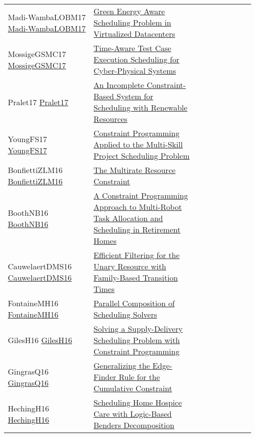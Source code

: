 {\begin{longtable}{p{3cm}p{7cm}lllllll}
Madi-WambaLOBM17 \href{https://doi.org/10.1109/ICPADS.2017.00089}{Madi-WambaLOBM17} &  \href{papers/Madi-WambaLOBM17.pdf}{Green Energy Aware Scheduling Problem in Virtualized Datacenters} &  &  &  &  &  &  & \\
MossigeGSMC17 \href{https://doi.org/10.1007/978-3-319-66158-2\_25}{MossigeGSMC17} &  \href{papers/MossigeGSMC17.pdf}{Time-Aware Test Case Execution Scheduling for Cyber-Physical Systems} &  &  &  &  &  &  & \\
Pralet17 \href{https://doi.org/10.1007/978-3-319-66158-2\_16}{Pralet17} &  \href{papers/Pralet17.pdf}{An Incomplete Constraint-Based System for Scheduling with Renewable Resources} &  &  &  &  &  &  & \\
YoungFS17 \href{https://doi.org/10.1007/978-3-319-66158-2\_20}{YoungFS17} &  \href{papers/YoungFS17.pdf}{Constraint Programming Applied to the Multi-Skill Project Scheduling Problem} &  &  &  &  &  &  & \\
BonfiettiZLM16 \href{https://doi.org/10.1007/978-3-319-44953-1\_8}{BonfiettiZLM16} &  \href{papers/BonfiettiZLM16.pdf}{The Multirate Resource Constraint} &  &  &  &  &  &  & \\
BoothNB16 \href{https://doi.org/10.1007/978-3-319-44953-1\_34}{BoothNB16} &  \href{papers/BoothNB16.pdf}{A Constraint Programming Approach to Multi-Robot Task Allocation and Scheduling in Retirement Homes} &  &  &  &  &  &  & \\
CauwelaertDMS16 \href{https://doi.org/10.1007/978-3-319-44953-1\_33}{CauwelaertDMS16} &  \href{papers/CauwelaertDMS16.pdf}{Efficient Filtering for the Unary Resource with Family-Based Transition Times} &  &  &  &  &  &  & \\
FontaineMH16 \href{https://doi.org/10.1007/978-3-319-33954-2\_12}{FontaineMH16} &  \href{papers/FontaineMH16.pdf}{Parallel Composition of Scheduling Solvers} &  &  &  &  &  &  & \\
GilesH16 \href{https://doi.org/10.1007/978-3-319-44953-1\_38}{GilesH16} &  \href{papers/GilesH16.pdf}{Solving a Supply-Delivery Scheduling Problem with Constraint Programming} &  &  &  &  &  &  & \\
GingrasQ16 \href{http://www.ijcai.org/Abstract/16/440}{GingrasQ16} &  \href{papers/GingrasQ16.pdf}{Generalizing the Edge-Finder Rule for the Cumulative Constraint} &  &  &  &  &  &  & \\
HechingH16 \href{https://doi.org/10.1007/978-3-319-33954-2\_14}{HechingH16} &  \href{papers/HechingH16.pdf}{Scheduling Home Hospice Care with Logic-Based Benders Decomposition} &  &  &  &  &  &  & \\

\end{longtable}}
